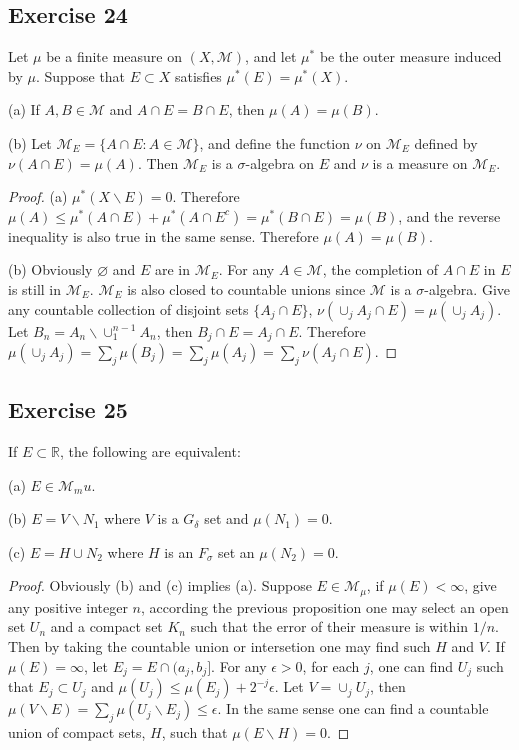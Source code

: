 \subsection*{Exercise 24}
Let $\mu$ be a finite measure on $(X,\mathcal{M})$, and let $\mu^*$ be the outer measure induced by $\mu$. Suppose that $E\subset X$ satisfies $\mu^*(E)=\mu^*(X)$.
\par (a) If $A,B\in\mathcal{M}$ and $A\cap E=B\cap E$, then $\mu(A)=\mu(B)$.
\par (b) Let $\mathcal{M}_E=\{A\cap E:A\in\mathcal{M}\}$, and define the function $\nu$ on $\mathcal{M}_E$ defined by $\nu(A\cap E)=\mu(A)$. Then $\mathcal{M}_E$ is a $\sigma$-algebra on $E$ and $\nu$ is a measure on $\mathcal{M}_E$.
\begin{proof}
    (a) $\mu^*(X\backslash E)=0$. Therefore $\mu(A)\le\mu^*(A\cap E)+\mu^*(A\cap E^c)=\mu^*(B\cap E)=\mu(B)$, and the reverse inequality is also true in the same sense. Therefore $\mu(A)=\mu(B)$.
    \par (b) Obviously $\varnothing$ and $E$ are in $\mathcal{M}_E$. For any $A\in\mathcal{M}$, the completion of $A\cap E$ in $E$ is still in $\mathcal{M}_E$. $\mathcal{M}_E$ is also closed to countable unions since $\mathcal{M}$ is a $\sigma$-algebra. Give any countable collection of disjoint sets $\{A_j\cap E\}$, $\nu(\cup_j A_j\cap E)=\mu(\cup_j A_j)$. Let $B_n=A_n\backslash\cup^{n-1}_1A_n$, then $B_j\cap E=A_j\cap E$. Therefore $\mu(\cup_j A_j)=\sum_j\mu(B_j)=\sum_j\mu(A_j)=\sum_j\nu(A_j\cap E)$.
\end{proof}
\subsection*{Exercise 25}
If $E\subset\mathbb{R}$, the following are equivalent:
\par (a) $E\in\mathcal{M}_mu$.
\par (b) $E=V\backslash N_1$ where $V$ is a $G_\delta$ set and $\mu(N_1)=0$.
\par (c) $E=H\cup N_2$ where $H$ is an $F_\sigma$ set an $\mu(N_2)=0$.
\begin{proof}
    Obviously (b) and (c) implies (a). Suppose $E\in\mathcal{M}_\mu$, if $\mu(E)<\infty$, give any positive integer $n$, according the previous proposition one may select an open set $U_n$ and a compact set $K_n$ such that the error of their measure is within $1/n$. Then by taking the countable union or intersetion one may find such $H$ and $V$. If $\mu(E)=\infty$, let $E_j=E\cap(a_j,b_j]$. For any $\epsilon>0$, for each $j$, one can find $U_j$ such that $E_j\subset U_j$ and $\mu(U_j)\le\mu(E_j)+2^{-j}\epsilon$. Let $V=\cup_j U_j$, then $\mu(V\backslash E)=\sum_j\mu(U_j\backslash E_j)\le\epsilon$. In the same sense one can find a countable union of compact sets, $H$, such that $\mu(E\backslash H)=0$.
\end{proof}
